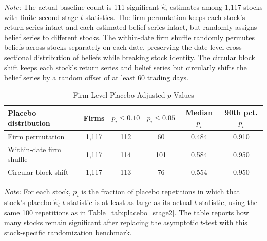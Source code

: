 \begin{table}[H]
\centering
\caption{Aggregate Placebo Tests for Second-Stage $\hat{\kappa}_i$ Significance}
\label{tab:placebo_stage2}
\medskip
\begin{minipage}{0.96\textwidth}
\footnotesize
\textit{Note:} The actual baseline count is 111 significant $\hat\kappa_i$ estimates among 1{,}117 stocks with finite second-stage $t$-statistics.
The firm permutation keeps each stock's return series intact and each estimated belief series intact, but randomly assigns belief series to different stocks.
The within-date firm shuffle randomly permutes beliefs across stocks separately on each date, preserving the date-level cross-sectional distribution of beliefs while breaking stock identity.
The circular block shift keeps each stock's return series and belief series but circularly shifts the belief series by a random offset of at least 60 trading days.
\end{minipage}
\end{table}

\begin{table}[H]
\centering
\caption{Firm-Level Placebo-Adjusted $p$-Values}
\label{tab:placebo_stage2_firm_pvalues}
\begin{tabular}{lccccc}
\toprule
Placebo distribution & Firms & $p_i \leq 0.10$ & $p_i \leq 0.05$ & Median $p_i$ & 90th pct. $p_i$ \\
\midrule
Firm permutation & 1{,}117 & 112 & 60 & 0.484 & 0.910 \\
Within-date firm shuffle & 1{,}117 & 114 & 101 & 0.584 & 0.950 \\
Circular block shift & 1{,}117 & 113 & 76 & 0.554 & 0.950 \\
\bottomrule
\end{tabular}
\medskip
\begin{minipage}{0.92\textwidth}
\footnotesize
\textit{Note:} For each stock, $p_i$ is the fraction of placebo repetitions in which that stock's placebo $\hat\kappa_i$ $t$-statistic is at least as large as its actual $t$-statistic, using the same 100 repetitions as in Table~\ref{tab:placebo_stage2}.
The table reports how many stocks remain significant after replacing the asymptotic $t$-test with this stock-specific randomization benchmark.
\end{minipage}
\end{table}

